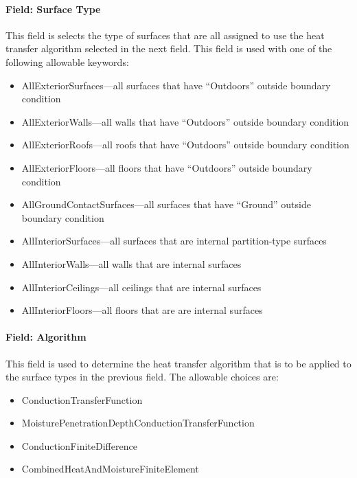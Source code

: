 \paragraph{Field: Surface Type}\label{field-surface-type}

This field is selects the type of surfaces that are all assigned to use the heat transfer algorithm selected in the next field. This field is used with one of the following allowable keywords:

\begin{itemize}
\item
  AllExteriorSurfaces---all surfaces that have ``Outdoors'' outside boundary condition
\item
  AllExteriorWalls---all walls that have ``Outdoors'' outside boundary condition
\item
  AllExteriorRoofs---all roofs that have ``Outdoors'' outside boundary condition
\item
  AllExteriorFloors---all floors that have ``Outdoors'' outside boundary condition
\item
  AllGroundContactSurfaces---all surfaces that have ``Ground'' outside boundary condition
\item
  AllInteriorSurfaces---all surfaces that are internal partition-type surfaces
\item
  AllInteriorWalls---all walls that are internal surfaces
\item
  AllInteriorCeilings---all ceilings that are internal surfaces
\item
  AllInteriorFloors---all floors that are are internal surfaces
\end{itemize}

\paragraph{Field: Algorithm}\label{field-algorithm-1}

This field is used to determine the heat transfer algorithm that is to be applied to the surface types in the previous field. The allowable choices are:

\begin{itemize}
\item
  ConductionTransferFunction
\item
  MoisturePenetrationDepthConductionTransferFunction
\item
  ConductionFiniteDifference
\item
  CombinedHeatAndMoistureFiniteElement
\end{itemize}

